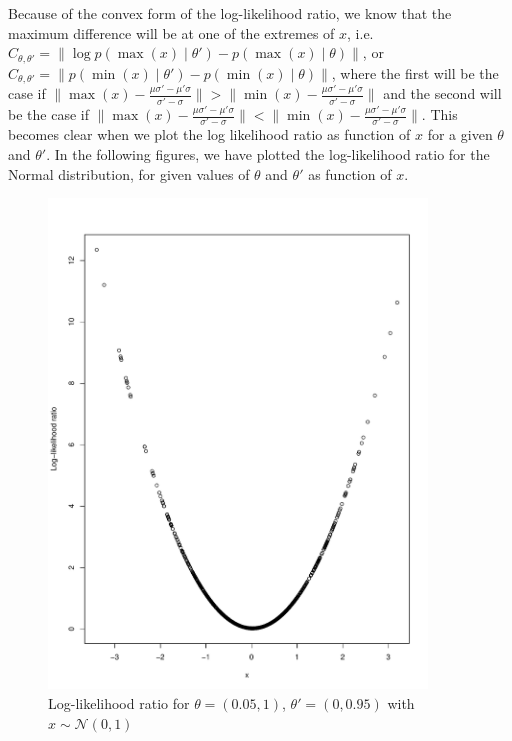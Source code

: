 Because of the convex form of the log-likelihood ratio, we know that the maximum difference will be at one of the extremes of $x$, i.e. $C_{\theta, \theta'} = \lVert \log p\left(\max\left(x\right)\mid \theta'\right) - p\left(\max\left(x\right)\mid \theta\right)\rVert$, or $C_{\theta, \theta'} = \lVert p\left(\min\left(x\right)\mid \theta'\right) - p\left(\min\left(x\right)\mid \theta\right)\rVert$, where the first will be the case if $\lVert \max\left(x\right) - \frac{\mu\sigma' - \mu'\sigma}{\sigma' - \sigma}\rVert > \lVert \min\left(x\right) - \frac{\mu\sigma' - \mu'\sigma}{\sigma' - \sigma}\rVert$
and the second will be the case if 
$\lVert\max\left(x\right) - \frac{\mu\sigma' - \mu'\sigma}{\sigma' - \sigma}\rVert < \lVert \min\left(x\right) - \frac{\mu\sigma' - \mu'\sigma}{\sigma' - \sigma}\rVert$. This becomes clear when we plot the log likelihood ratio as function of $x$ for a given $\theta$ and $\theta'$. 
In the following figures, we have plotted the log-likelihood ratio for the Normal distribution, for given values of $\theta$ and $\theta'$ as function of $x$.   
\begin{figure}[H]
    \centering
    \includegraphics[scale = 0.6, height=13cm]{figures/loglik_ratio1.pdf}
    \caption{Log-likelihood ratio for $\theta = \left(0.05, 1\right)$, $\theta' = \left(0, 0.95\right)$  with $x \sim \mathcal{N}\left(0,1\right)$}
    \label{fig:loglik_ratio_gaussian}
\end{figure}
